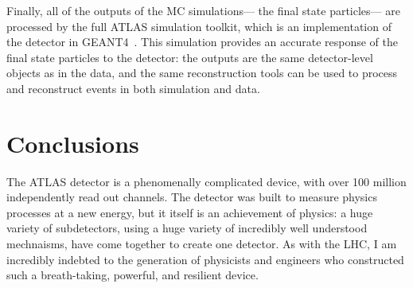 Finally, all of the outputs of the MC simulations--- the final state particles--- are processed by the full ATLAS simulation toolkit, which is an implementation of the detector in GEANT4~\cite{geant,simulation}. This simulation provides an accurate response of the final state particles to the detector: the outputs are the same detector-level objects as in the data, and the same reconstruction tools can be used to process and reconstruct events in both simulation and data.


\section{Conclusions} 

The ATLAS detector is a phenomenally complicated device, with over 100 million independently read out channels. The detector was built to measure physics processes at a new energy, but it itself is an achievement of physics: a huge variety of subdetectors, using a huge variety of incredibly well understood mechnaisms, have come together to create one detector. As with the LHC, I am incredibly indebted to the generation of physicists and engineers who constructed such a breath-taking, powerful, and resilient device.

